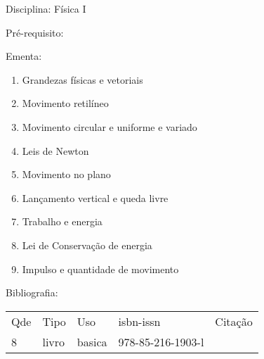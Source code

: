 \documentclass[12pt,a4paper,twoside]{report}
\begin{document}
Disciplina: Física I

Pré-requisito:
\begin{enumerate}
\end{enumerate}

Ementa:
\begin{enumerate}
\item Grandezas físicas e vetoriais
\item Movimento retilíneo
\item Movimento circular e uniforme e variado
\item Leis de Newton
\item Movimento no plano
\item Lançamento vertical e queda livre
\item Trabalho e energia
\item Lei de Conservação de energia
\item Impulso e quantidade de movimento
\end{enumerate}

Bibliografia:
\begin{tabular}{lllll}
Qde & Tipo & Uso & isbn-issn & Citação \\
8&livro&basica&978-85-216-1903-l&\\
\end{tabular}
\end{document}
